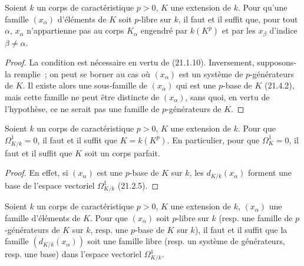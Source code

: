 \begin{corollary}[21.4.3]
\label{0.21.4.3-fr}
Soient $k$ un corps de caractéristique $p>0$, $K$ une extension de $k$.
Pour qu'une famille $(x_\alpha)$ d'éléments de $K$ soit $p$-libre sur $k$,
il faut et il suffit que, pour tout $\alpha$, $x_\alpha$ n'appartienne pas au
corps $K_\alpha$ engendré par $k(K^p)$ et par les $x_\beta$ d'indice
$\beta\neq\alpha$.
\end{corollary}

\begin{proof}
La condition est nécessaire en vertu de (21.1.10). Inversement, supposons-la
remplie~; on peut se borner au cas où $(x_\alpha)$ est un système de
$p$-générateurs de $K$. Il existe alors une sous-famille de $(x_\alpha)$ qui
est une $p$-base de $K$ (21.4.2), mais cette famille ne peut être distincte de
$(x_\alpha)$, sans quoi, en vertu de l'hypothèse, ce ne serait pas une famille
de $p$-générateurs de $K$.
\end{proof}

\begin{corollary}[21.4.4]
\label{0.21.4.4-fr}
Soient $k$ un corps de caractéristique $p>0$, $K$ une extension de $k$.
Pour que $\Omega^1_{K/k}=0$, il faut et il suffit que $K=k(K^p)$.
En particulier, pour que $\Omega^1_K=0$, il faut et il suffit que $K$ soit
un corps parfait.
\end{corollary}

\begin{proof}
En effet, si $(x_\alpha)$ est une $p$-base de $K$ sur $k$, les
$d_{K/k}(x_\alpha)$ forment une base de l'espace vectoriel $\Omega^1_{K/k}$
(21.2.5).
\end{proof}

\begin{theorem}[21.4.5]
\label{0.21.4.5-fr}
Soient $k$ un corps de caractéristique $p>0$, $K$ une extension de $k$,
$(x_\alpha)$ une famille d'éléments de $K$. Pour que $(x_\alpha)$ soit
$p$-libre sur $k$ (resp. une famille de $p$-générateurs de $K$ sur $k$,
resp. une $p$-base de $K$ sur $k$), il faut et il suffit que la famille
$(d_{K/k}(x_\alpha))$ soit une famille libre (resp. un système de
générateurs, resp. une base) dans l'espace vectoriel $\Omega^1_{K/k}$.
\end{theorem}

